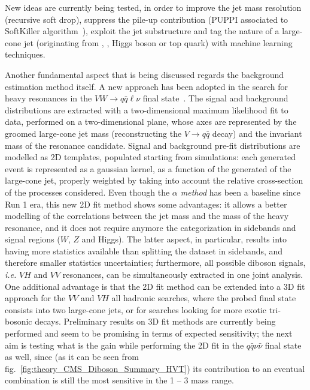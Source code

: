 \noindent New ideas are currently being tested, in order to improve the jet mass resolution (recursive soft drop), suppress the pile-up contribution (PUPPI associated to SoftKiller algorithm~\cite{Cacciari:2014gra}), exploit the jet substructure and tag the nature of a large-cone jet (originating from \W, \Z, Higgs boson or top quark) with machine learning techniques. %

\noindent Another fundamental aspect that is being discussed regards the background estimation method itself. A new approach has been adopted in the search for heavy resonances in the $VW \rightarrow q \bar{q} \ell \nu$ final state~\cite{CMS-PAS-B2G-16-029}. The signal and background distributions are extracted with a two-dimensional maximum likelihood fit to data, performed on a two-dimensional plane, whose axes are represented by the groomed large-cone jet mass (reconstructing the $V \rightarrow q \bar{q}$ decay) and the invariant mass of the resonance candidate. Signal and background pre-fit distributions are modelled as 2D templates, populated starting from simulations: each generated event is represented as a gaussian kernel, as a function of the generated \pt of the large-cone jet, properly weighted by taking into account the relative cross-section of the processes considered. Even though the \emph{$\alpha$ method} has been a baseline since Run 1 era, this new 2D fit method shows some advantages: it allows a better modelling of the correlations between the jet mass and the mass of the heavy resonance, and it does not require anymore the categorization in sidebands and signal regions ($W$, $Z$ and Higgs). The latter aspect, in particular, results into having more statistics available than splitting the dataset in sidebands, and therefore smaller statistics uncertainties; furthermore, all possible diboson signals, \textit{i.e.} $VH$ and $VV$ resonances, can be simultaneously extracted in one joint analysis. One additional advantage is that the 2D fit method can be extended into a 3D fit approach for the $VV$ and $VH$ all hadronic searches, where the probed final state consists into two large-cone jets, or for searches looking for more exotic tri-bosonic decays. Preliminary results on 3D fit methods are currently being performed and seem to be promising in terms of expected sensitivity; the next aim is testing what is the gain while performing the 2D fit in the $q \bar{q} \nu \bar{\nu}$ final state as well, since (as it can be seen from fig.~\ref{fig:theory_CMS_Diboson_Summary_HVT}) its contribution to an eventual combination is still the most sensitive in the 1 \TeV -- 3 \TeV mass range.

\clearpage

